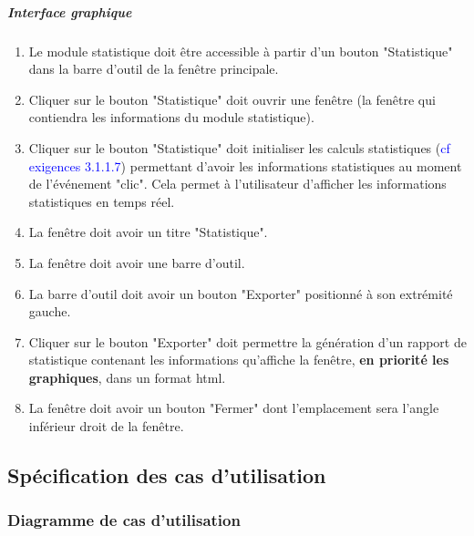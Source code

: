 \documentclass[10pt,a4paper]{report}
\begin{document}
	\subparagraph{Interface graphique}
	
		\begin{enumerate}

			\item Le module statistique doit être accessible à partir d'un bouton "Statistique" dans la barre d'outil de la fenêtre principale.

			\item Cliquer sur le bouton "Statistique" doit ouvrir une fenêtre (la fenêtre qui contiendra les informations du module statistique).

			\item Cliquer sur le bouton "Statistique" doit initialiser les calculs statistiques (\textcolor{blue}{cf exigences 3.1.1.7}) permettant d'avoir les informations statistiques au moment de l'événement "clic". Cela permet à l'utilisateur d'afficher les informations statistiques en temps réel.

			\item La fenêtre doit avoir un titre "Statistique".

			\item La fenêtre doit avoir une barre d'outil.
	
			\item La barre d'outil doit avoir un bouton "Exporter" positionné à son extrémité gauche.

			\item Cliquer sur le bouton "Exporter" doit permettre la génération d'un rapport de statistique contenant les informations qu'affiche la fenêtre, \textbf{en priorité les graphiques}, dans un format html.

			\item La fenêtre doit avoir un bouton "Fermer" dont l'emplacement sera l'angle inférieur droit de la fenêtre. 

		\end{enumerate}
	

\subsection{Spécification des cas d’utilisation}

\subsubsection{Diagramme de cas d'utilisation}
\end{document}
